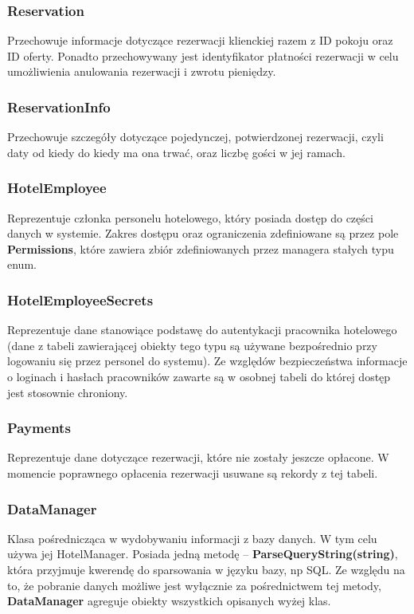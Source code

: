 \documentclass{article}
\begin{document}
\subsubsection{Reservation}
Przechowuje informacje dotyczące rezerwacji klienckiej razem z ID pokoju oraz ID oferty. Ponadto przechowywany jest identyfikator płatności rezerwacji w celu umożliwienia anulowania rezerwacji i zwrotu pieniędzy.

\subsubsection{ReservationInfo}
Przechowuje szczegóły dotyczące pojedynczej, potwierdzonej rezerwacji, czyli daty od kiedy do kiedy ma ona trwać, oraz liczbę gości w jej ramach.

\subsubsection{HotelEmployee}
Reprezentuje członka personelu hotelowego, który posiada dostęp do części danych w systemie. Zakres dostępu oraz ograniczenia zdefiniowane są przez pole \textbf{Permissions}, które zawiera zbiór zdefiniowanych przez managera stałych typu enum.

\subsubsection{HotelEmployeeSecrets}
Reprezentuje dane stanowiące podstawę do autentykacji pracownika hotelowego (dane z tabeli zawierającej obiekty tego typu są używane bezpośrednio przy logowaniu się przez personel do systemu). Ze względów bezpieczeństwa informacje o loginach i hasłach pracowników zawarte są w osobnej tabeli do której dostęp jest stosownie chroniony.

\subsubsection{Payments}
Reprezentuje dane dotyczące rezerwacji, które nie zostały jeszcze opłacone. W momencie poprawnego opłacenia rezerwacji usuwane są rekordy z tej tabeli.

\subsubsection{DataManager}
Klasa pośrednicząca w wydobywaniu informacji z bazy danych. W tym celu używa jej HotelManager. Posiada jedną metodę – \textbf{ParseQueryString(string)}, która przyjmuje kwerendę do sparsowania w języku bazy, np SQL. Ze względu na to, że pobranie danych możliwe jest wyłącznie za pośrednictwem tej metody, \textbf{DataManager} agreguje obiekty wszystkich opisanych wyżej klas.
\end{document}
